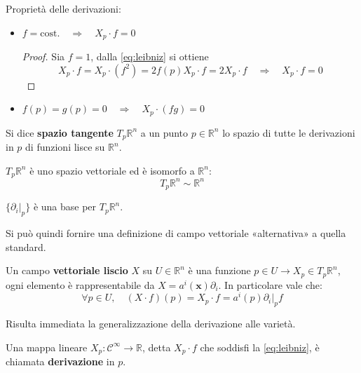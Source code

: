 \begin{property} Proprietà delle derivazioni:
    \begin{itemize}
        \item $f = \mathrm{cost.} \quad \Longrightarrow \quad X_p \cdot f = 0$
              \begin{proof}
                  Sia $f = 1$, dalla \ref{eq:leibniz} si ottiene
                  \[
                      X_p \cdot f = X_p \cdot (f^2) = 2 f(p) X_p \cdot f = 2 X_p \cdot f \quad \Longrightarrow \quad X_p \cdot f = 0
                  \]
              \end{proof}
        \item $f(p) = g(p) = 0 \quad \Longrightarrow \quad X_p \cdot (f g) = 0$
    \end{itemize}
\end{property}
\begin{definition}
    Si dice \textbf{spazio tangente} $T_p\mathbb{R}^n$ a un punto $p \in \mathbb{R}^n$ lo spazio di tutte le derivazioni in $p$ di funzioni lisce su $\mathbb{R}^n$.
\end{definition}
\begin{proposition}
    $T_p\mathbb{R}^n$ è uno spazio vettoriale ed è isomorfo a $\mathbb{R}^n$:
    \[
        T_p\mathbb{R}^n \sim \mathbb{R}^n
    \]
\end{proposition}
\begin{corollary}
    $\{ \left.\partial_i \right|_{p} \}$ è una base per $T_p\mathbb{R}^n$.
\end{corollary}
Si può quindi fornire una definizione di campo vettoriale «alternativa» a quella standard.

\begin{definition}\label{def:campo_vettoriale}
    Un campo \textbf{vettoriale liscio} $X$ su $U \in \mathbb{R}^n$ è una funzione $p \in U \rightarrow X_p \in T_p\mathbb{R}^n$, ogni elemento è rappresentabile da $X = a^i(\mathbf{x}) \partial_i$.
    In particolare vale che:
    \[
        \forall p \in U, \quad (X \cdot f)(p) = X_p \cdot f = a^i(p) \left.\partial_i \right|_p f
    \]
\end{definition}
Risulta immediata la generalizzazione della derivazione alle varietà.
\begin{definition}
    Una mappa lineare $X_p : \mathcal{C}^\infty \rightarrow \mathbb{R}$, detta $X_p \cdot f$ che soddisfi la \ref{eq:leibniz}, è chiamata \textbf{derivazione} in $p$.
\end{definition}

